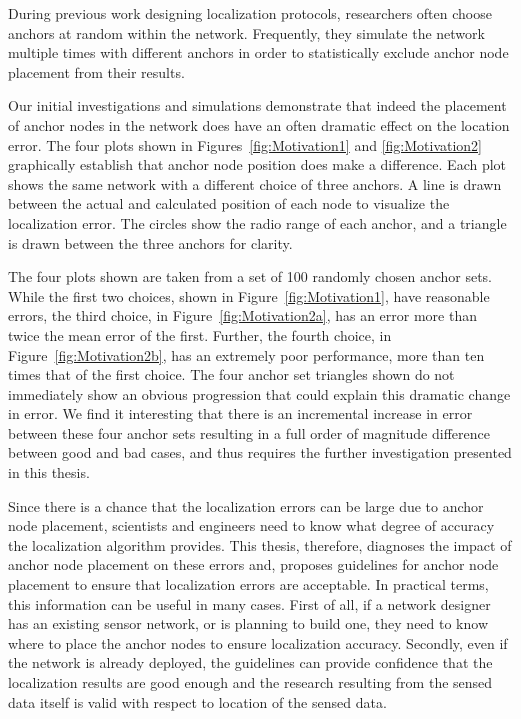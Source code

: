 During previous work designing localization protocols\cite[p.11]{CCA-MAP09}\cite[p.2]{MDS-MAP}, researchers often choose anchors at random within the network.  Frequently, they simulate the network multiple times with different anchors in order to statistically exclude anchor node placement from their results. 

Our initial investigations and simulations demonstrate that indeed the placement of anchor nodes in the network does have an often dramatic effect on the location error.  The four plots shown in Figures~\ref{fig:Motivation1} and \ref{fig:Motivation2} graphically establish that anchor node position does make a difference.  Each plot shows the same network with a different choice of three anchors.  A line is drawn between the actual and calculated position of each node to visualize the localization error.  The circles show the radio range of each anchor, and a triangle is drawn between the three anchors for clarity.  

The four plots shown are taken from a set of 100 randomly chosen anchor sets.  While the first two choices, shown in Figure~\ref{fig:Motivation1}, have reasonable errors, the third choice, in Figure~\ref{fig:Motivation2a}, has an error more than twice the mean error of the first.  Further, the fourth choice, in Figure~\ref{fig:Motivation2b}, has an extremely poor performance, more than ten times that of the first choice.  The four anchor set triangles shown do not immediately show an obvious progression that could explain this dramatic change in error. We find it interesting that there is an incremental increase in error between these four anchor sets resulting in a full order of magnitude difference between good and bad cases, and thus requires the further investigation presented in this thesis.

Since there is a chance that the localization errors can be large due to anchor node placement, scientists and engineers need to know what degree of accuracy the localization algorithm provides.  This thesis, therefore, diagnoses the impact of anchor node placement on these errors and, proposes guidelines for anchor node placement to ensure that localization errors are acceptable.  In practical terms, this information can be useful in many cases. First of all, if a network designer has an existing sensor network, or is planning to build one, they need to know where to place the anchor nodes to ensure localization accuracy.  Secondly, even if the network is already deployed, the guidelines can provide confidence that the localization results are good enough and the research resulting from the sensed data itself is valid with respect to location of the sensed data. 

